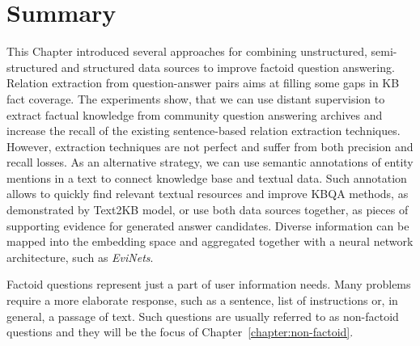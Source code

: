 
\section{Summary}
\label{section:factoid:summary}

This Chapter introduced several approaches for combining unstructured, semi-structured and structured data sources to improve factoid question answering.
Relation extraction from question-answer pairs aims at filling some gaps in KB fact coverage.
The experiments show, that we can use distant supervision to extract factual knowledge from community question answering archives and increase the recall of the existing sentence-based relation extraction techniques.
However, extraction techniques are not perfect and suffer from both precision and recall losses.
As an alternative strategy, we can use semantic annotations of entity mentions in a text to connect knowledge base and textual data.
Such annotation allows to quickly find relevant textual resources and improve KBQA methods, as demonstrated by Text2KB model, or use both data sources together, as pieces of supporting evidence for generated answer candidates.
Diverse information can be mapped into the embedding space and aggregated together with a neural network architecture, such as \textit{EviNets}.

Factoid questions represent just a part of user information needs. Many problems require a more elaborate response, such as a sentence, list of instructions or, in general, a passage of text.
Such questions are usually referred to as non-factoid questions and they will be the focus of Chapter~\ref{chapter:non-factoid}.




